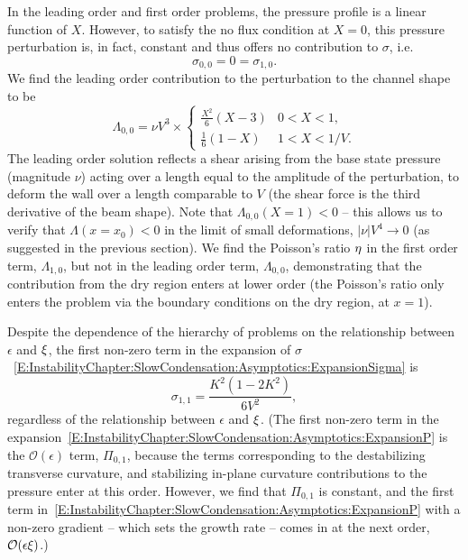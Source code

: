 In the leading order and first order problems, the pressure profile is a linear function of $X$. However, to satisfy the no flux condition at $X =0$, this pressure perturbation is, in fact, constant and thus offers no contribution to $\sigma$, i.e.
\begin{equation}
\sigma_{0,0} = 0 = \sigma_{1,0}.
\end{equation}
We find the leading order contribution to the perturbation to the channel shape to be
\begin{equation}
\Lambda_{0,0} =\nu V^3 \times \begin{cases}
\frac{X^2}{6}(X - 3) & 0 < X < 1,\\
\frac{1}{6}(1-X) & 1 < X < 1/V.
\end{cases}
\end{equation}
The leading order solution reflects a shear arising from the base state pressure (magnitude $\nu$) acting over a length equal to the amplitude of the perturbation, to deform the wall over a length comparable to $V$ (the shear force is the third derivative of the beam shape). Note that $\Lambda_{0,0}(X=1) < 0$ -- this allows us to verify that $\Lambda(x = x_0) < 0$ in the limit of small deformations, $|\nu| V^4 \to 0$ (as suggested in the previous section). We find the Poisson's ratio $\eta$ in the first order term, $\Lambda_{1,0}$, but not in the leading order term, $\Lambda_{0,0}$, demonstrating that the contribution from the dry region enters at lower order (the Poisson's ratio only enters the problem via the boundary conditions on the dry region, at $x = 1$).

Despite the dependence of the hierarchy of problems on the relationship between $\epsilon$ and $\xi$, the first non-zero term in the expansion of $\sigma$~\eqref{E:InstabilityChapter:SlowCondensation:Asymptotics:ExpansionSigma} is
\begin{equation}\label{E:InstabilityChapter:SlowCondensation:Asymptotics:LeadingOrderSigma}
\sigma_{1,1} = \frac{K^2\left(1-2K^2\right)}{6V^2},
\end{equation}
regardless of the relationship between $\epsilon$ and $\xi$. (The first non-zero term in the expansion~\eqref{E:InstabilityChapter:SlowCondensation:Asymptotics:ExpansionP} is the $\mathcal{O}(\epsilon)$ term, $\Pi_{0,1}$, because the terms corresponding to the destabilizing transverse curvature, and stabilizing in-plane curvature contributions to the pressure enter at this order.  However, we find that $\Pi_{0,1}$ is constant, and the first term in~\eqref{E:InstabilityChapter:SlowCondensation:Asymptotics:ExpansionP} with a non-zero gradient -- which sets the growth rate -- comes in at the next order, $\mathcal{O}(\epsilon \xi)$.)

